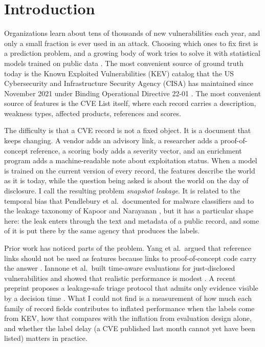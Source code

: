 \documentclass[11pt,a4paper]{article}
\begin{document}
\section{Introduction}

Organizations learn about tens of thousands of new vulnerabilities each year, and only a small fraction is ever used in an attack. Choosing which ones to fix first is a prediction problem, and a growing body of work tries to solve it with statistical models trained on public data \cite{bozorgi2010,sabottke2015,jacobs2019,suciu2022,jacobs2023}. The most convenient source of ground truth today is the Known Exploited Vulnerabilities (KEV) catalog that the US Cybersecurity and Infrastructure Security Agency (CISA) has maintained since November 2021 under Binding Operational Directive 22-01 \cite{bod2201,kev}. The most convenient source of features is the CVE List itself, where each record carries a description, weakness types, affected products, references and scores.

The difficulty is that a CVE record is not a fixed object. It is a document that keeps changing. A vendor adds an advisory link, a researcher adds a proof-of-concept reference, a scoring body adds a severity vector, and an enrichment program adds a machine-readable note about exploitation status. When a model is trained on the current version of every record, the features describe the world as it is today, while the question being asked is about the world on the day of disclosure. I call the resulting problem \emph{snapshot leakage}. It is related to the temporal bias that Pendlebury et al.\ documented for malware classifiers \cite{pendlebury2019} and to the leakage taxonomy of Kapoor and Narayanan \cite{kapoor2023}, but it has a particular shape here: the leak enters through the text and metadata of a public record, and some of it is put there by the same agency that produces the labels.

Prior work has noticed parts of the problem. Yang et al.\ argued that reference links should not be used as features because links to proof-of-concept code carry the answer \cite{yang2020}. Iannone et al.\ built time-aware evaluations for just-disclosed vulnerabilities and showed that realistic performance is modest \cite{iannone2024}. A recent preprint proposes a leakage-safe triage protocol that admits only evidence visible by a decision time \cite{alpay2026}. What I could not find is a measurement of how much each family of record fields contributes to inflated performance when the labels come from KEV, how that compares with the inflation from evaluation design alone, and whether the label delay (a CVE published last month cannot yet have been listed) matters in practice.
\end{document}
